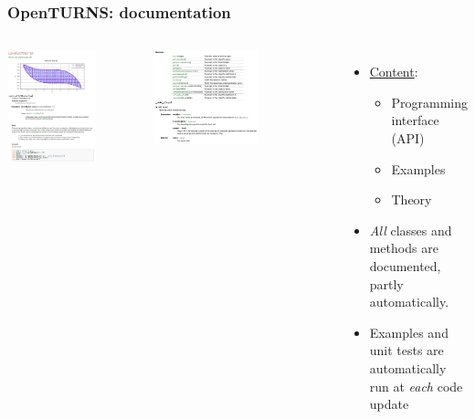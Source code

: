 \documentclass[aspectratio=169]{beamer}
\begin{document}
\begin{frame}[containsverbatim]
  \frametitle{OpenTURNS: documentation}
  
  
  \begin{columns}
  	\vspace{10pt}
  
  \vspace{-30pt}
      \includegraphics[width=0.7\textwidth]{figures/exClasses.png}
  
      
      \includegraphics[width=0.6\textwidth]{figures/exClasses2.png}
  
    \scriptsize{

    \begin{itemize}
    \item \underline{Content}: 
    \begin{itemize}
    \item Programming interface (API)
    \item Examples
    \item Theory
    \end{itemize}
    \item \emph{All} classes and methods 
    are documented, partly automatically.
    \item Examples and unit tests are automatically run at \emph{each} code update 
    \end{itemize}
      }
  \end{columns}
  


\end{frame}
\end{document}
